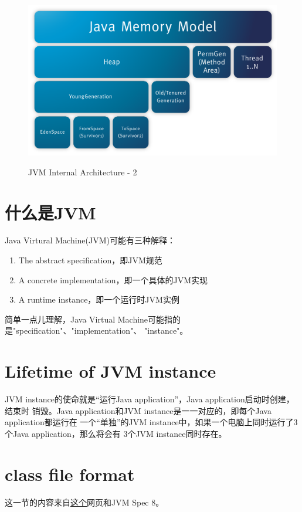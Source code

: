 \documentclass[a4paper,11pt]{article}
\begin{document}
\begin{figure}
  \centering
  \includegraphics[width=\textwidth]{picturedir/JVMRuntimeDataArea.png}\\
  \caption{JVM Internal Architecture - 2}\label{fig:jvm2}
\end{figure}

\section[什么是JVM]{什么是JVM}
Java Virtural Machine(JVM)可能有三种解释：
\begin{enumerate}
  \item The abstract specification，即JVM规范
  \item A concrete implementation，即一个具体的JVM实现
  \item A runtime instance，即一个运行时JVM实例
\end{enumerate}
简单一点儿理解，Java Virtual Machine可能指的是"specification"、"implementation"、
"instance"。

\section[Lifetime of JVM instance]{Lifetime of JVM instance}
JVM instance的使命就是“运行Java application”，Java application启动时创建，结束时
销毁。Java application和JVM instance是一一对应的，即每个Java application都运行在
一个“单独”的JVM instance中，如果一个电脑上同时运行了3个Java application，那么将会有
3个JVM instance同时存在。

\section[class file format]{class file format}
这一节的内容来自\href{http://hxraid.iteye.com/blog/687660}{这个}网页和JVM Spec 8。
\end{document}
